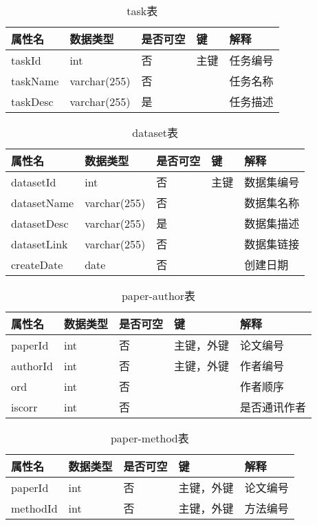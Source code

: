 \begin{table}[htbp!]
    \centering
    \caption{task表}
    \begin{tabular}{|l|l|l|l|l|}
    \hline
        属性名 & 数据类型 & 是否可空 & 键 & 解释 \\ \hline
        taskId & int & 否 & 主键 & 任务编号 \\ \hline
        taskName & varchar(255) & 否 &  & 任务名称 \\ \hline
        taskDesc & varchar(255) & 是 &  & 任务描述 \\ \hline
    \end{tabular}
    \label{tab:task}
\end{table}

\begin{table}[htbp!]
    \centering
    \caption{dataset表}
    \begin{tabular}{|l|l|l|l|l|}
    \hline
        属性名 & 数据类型 & 是否可空 & 键 & 解释 \\ \hline
        datasetId & int & 否 & 主键 & 数据集编号 \\ \hline
        datasetName & varchar(255) & 否 &  & 数据集名称 \\ \hline
        datasetDesc & varchar(255) & 是 &  & 数据集描述 \\ \hline
        datasetLink & varchar(255) & 否 &  & 数据集链接 \\ \hline
        createDate & date & 否 &  & 创建日期 \\ \hline
    \end{tabular}
    \label{tab:dataset}
\end{table}

\begin{table}[htbp!]
    \centering
    \caption{paper-author表}
    \begin{tabular}{|l|l|l|l|l|}
    \hline
        属性名 & 数据类型 & 是否可空 & 键 & 解释 \\ \hline
        paperId & int & 否 & 主键，外键 & 论文编号 \\ \hline
        authorId & int & 否 & 主键，外键 & 作者编号 \\ \hline
        ord & int & 否 &  & 作者顺序 \\ \hline
        iscorr & int & 否 &  & 是否通讯作者 \\ \hline
    \end{tabular}
    \label{tab:paper-author}
\end{table}

\begin{table}[htbp!]
    \centering
    \caption{paper-method表}
    \begin{tabular}{|l|l|l|l|l|}
    \hline
        属性名 & 数据类型 & 是否可空 & 键 & 解释 \\ \hline
        paperId & int & 否 & 主键，外键 & 论文编号 \\ \hline
        methodId & int & 否 & 主键，外键 & 方法编号 \\ \hline
    \end{tabular}
    \label{tab:paper-method}
\end{table}

